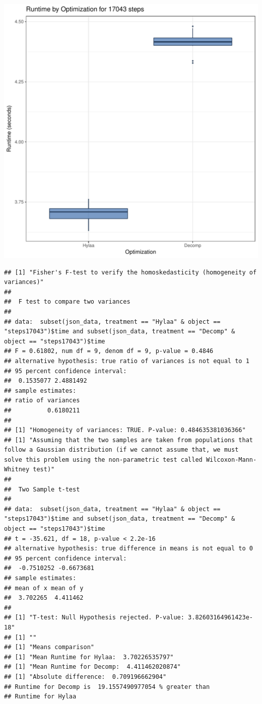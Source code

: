 \documentclass{article}\usepackage[]{graphicx}\usepackage[]{color}
\makeatletter
\def\maxwidth{ %
  \ifdim\Gin@nat@width>\linewidth
    \linewidth
  \else
    \Gin@nat@width
  \fi
}
\newenvironment{kframe}{%
 \def\at@end@of@kframe{}%
 \ifinner\ifhmode%
  \def\at@end@of@kframe{\end{minipage}}%
  \begin{minipage}{\columnwidth}%
 \fi\fi%
 \def\FrameCommand##1{\hskip\@totalleftmargin \hskip-\fboxsep
 \colorbox{shadecolor}{##1}\hskip-\fboxsep
     \hskip-\linewidth \hskip-\@totalleftmargin \hskip\columnwidth}%
 \MakeFramed {\advance\hsize-\width
   \@totalleftmargin\z@ \linewidth\hsize
   \@setminipage}}%
 {\par\unskip\endMakeFramed%
 \at@end@of@kframe}
\newenvironment{knitrout}{}{} %
\makeatother
\begin{document}
\begin{knitrout}
\color{fgcolor}
\includegraphics[width=\maxwidth]{figure/RH2_steps17043-1} 
\begin{kframe}\begin{verbatim}
## [1] "Fisher's F-test to verify the homoskedasticity (homogeneity of variances)"
## 
## 	F test to compare two variances
## 
## data:  subset(json_data, treatment == "Hylaa" & object == "steps17043")$time and subset(json_data, treatment == "Decomp" & object == "steps17043")$time
## F = 0.61802, num df = 9, denom df = 9, p-value = 0.4846
## alternative hypothesis: true ratio of variances is not equal to 1
## 95 percent confidence interval:
##  0.1535077 2.4881492
## sample estimates:
## ratio of variances 
##          0.6180211 
## 
## [1] "Homogeneity of variances: TRUE. P-value: 0.484635381036366"
## [1] "Assuming that the two samples are taken from populations that follow a Gaussian distribution (if we cannot assume that, we must solve this problem using the non-parametric test called Wilcoxon-Mann-Whitney test)"
## 
## 	Two Sample t-test
## 
## data:  subset(json_data, treatment == "Hylaa" & object == "steps17043")$time and subset(json_data, treatment == "Decomp" & object == "steps17043")$time
## t = -35.621, df = 18, p-value < 2.2e-16
## alternative hypothesis: true difference in means is not equal to 0
## 95 percent confidence interval:
##  -0.7510252 -0.6673681
## sample estimates:
## mean of x mean of y 
##  3.702265  4.411462 
## 
## [1] "T-test: Null Hypothesis rejected. P-value: 3.82603164961423e-18"
## [1] ""
## [1] "Means comparison"
## [1] "Mean Runtime for Hylaa:  3.70226535797"
## [1] "Mean Runtime for Decomp:  4.411462020874"
## [1] "Absolute difference:  0.709196662904"
## Runtime for Decomp is  19.1557490977054 % greater than 
## Runtime for Hylaa
\end{verbatim}
\end{kframe}
\end{knitrout}
\end{document}
